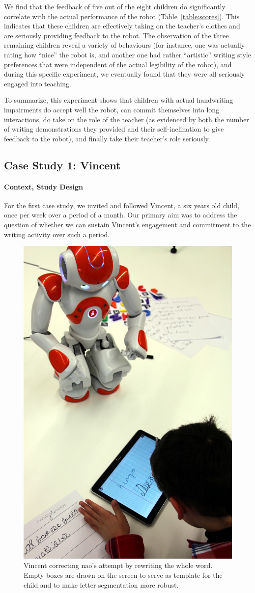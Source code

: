 \documentclass{article}
\begin{document}
We find that the feedback of five out of the eight children do significantly
correlate with the actual performance of the robot (Table~\ref{table:scores}).
This indicates that these children are effectively taking on the teacher's
clothes and are seriously providing feedback to the robot. The observation of
the three remaining children reveal a variety of behaviours (for instance, one
was actually rating how ``nice'' the robot is, and another one had rather
``artistic'' writing style preferences that were independent of the actual
legibility of the robot), and during this specific experiment, we eventually
found that they were all seriously engaged into teaching.

To summarize, this experiment shows that children with actual handwriting
impairments do accept well the robot, can commit themselves into long
interactions, do take on the role of the teacher (as evidenced by both the
number of writing demonstrations they provided and their self-inclination to
give feedback to the robot), and finally take their teacher's role seriously.

\subsection{Case Study 1: Vincent}

\paragraph{Context, Study Design}

For the first case study, we invited and followed Vincent, a six years old
child, once per week over a period of a month. Our primary aim was to address
the question of whether we can sustain Vincent's engagement and commitment to
the writing activity over such a period.

\begin{figure}
    \centering
    \includegraphics[width=0.5\linewidth]{diego}
    \caption{\small Vincent correcting {\sc nao}'s attempt by rewriting the
        whole word. Empty boxes are drawn on the screen to serve as template for the child
        and to make letter segmentation more robust.}
    \label{fig:diego}
\end{figure}
\end{document}
